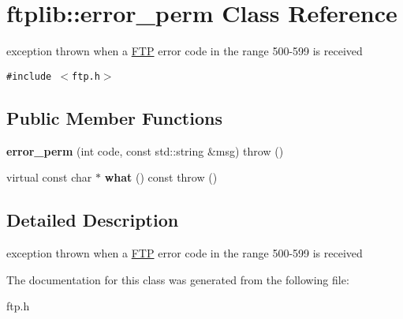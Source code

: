 \hypertarget{classftplib_1_1error__perm}{
\section{ftplib::error\_\-perm Class Reference}
\label{classftplib_1_1error__perm}
}
exception thrown when a \hyperlink{classftplib_1_1FTP}{FTP} error code in the range 500-599 is received  


{\tt \#include $<$ftp.h$>$}

\subsection*{Public Member Functions}
\begin{CompactItemize}
\item 
\hypertarget{classftplib_1_1error__perm_f39cb3638a78e6967e56d1f7e7346bfb}{
\textbf{error\_\-perm} (int code, const std::string \&msg)  throw ()}
\label{classftplib_1_1error__perm_f39cb3638a78e6967e56d1f7e7346bfb}

\item 
\hypertarget{classftplib_1_1error__perm_402201db39fc4088d7195a13ddce1f23}{
virtual const char $\ast$ \textbf{what} () const   throw ()}
\label{classftplib_1_1error__perm_402201db39fc4088d7195a13ddce1f23}

\end{CompactItemize}


\subsection{Detailed Description}
exception thrown when a \hyperlink{classftplib_1_1FTP}{FTP} error code in the range 500-599 is received 

The documentation for this class was generated from the following file:\begin{CompactItemize}
\item 
ftp.h\end{CompactItemize}
